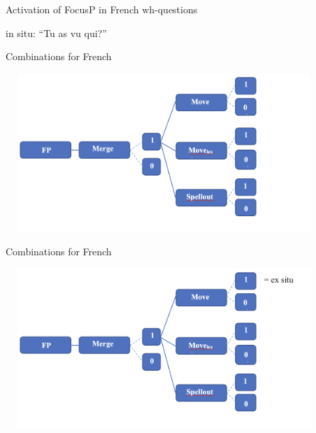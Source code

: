 \documentclass[lesson_slides]{subfiles}
\begin{document}
\begin{frame}[c]{Activation of FocusP in French wh-questions}

in situ: “Tu as vu qui?”

\end{frame}
\begin{frame}[c]{Combinations for French}

    \begin{center}
        \includegraphics[width=12cm, height=6cm]{images/combinationsfrenchb.png}
    \end{center}

\end{frame}
\begin{frame}[c]{Combinations for French}

    \begin{center}
        \includegraphics[width=12cm, height=6cm]{images/combinationsfrench1.png}
    \end{center}

\end{frame}
\end{document}
